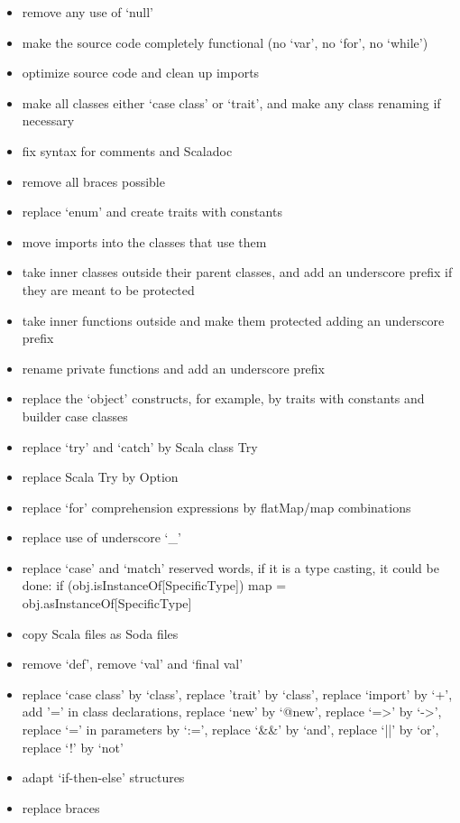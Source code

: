 \begin{itemize}
    \item remove any use of `null'
    \item make the source code completely functional (no `var', no `for', no `while')
    \item optimize source code and clean up imports
    \item make all classes either `case class' or `trait', and make any class renaming if necessary
    \item fix syntax for comments and Scaladoc
    \item remove all braces possible
    \item replace `enum' and create traits with constants
    \item move imports into the classes that use them
    \item take inner classes outside their parent classes, and add an underscore prefix if they are meant to be protected
    \item take inner functions outside and make them protected adding an underscore prefix
    \item rename private functions and add an underscore prefix
    \item replace the `object' constructs, for example, by traits with constants and builder case classes
    \item replace `try' and `catch' by Scala class Try
    \item replace Scala Try by Option
    \item replace `for' comprehension expressions by flatMap/map combinations
    \item replace use of underscore `\_'
    \item replace `case' and `match' reserved words, if it is a type casting, it could be done:
    if (obj.isInstanceOf[SpecificType]) {
        map = obj.asInstanceOf[SpecificType]
    }
    \item copy Scala files as Soda files
    \item remove `def', remove `val' and `final val'
    \item replace `case class' by `class', replace 'trait' by `class', replace `import' by `+', add '=' in class declarations,
    replace `new' by `@new', replace `=>' by `->', replace `=' in parameters by `:=',
    replace `\&\&' by `and', replace `||' by `or', replace `!' by `not'
    \item adapt `if-then-else' structures
    \item replace braces
\end{itemize}

